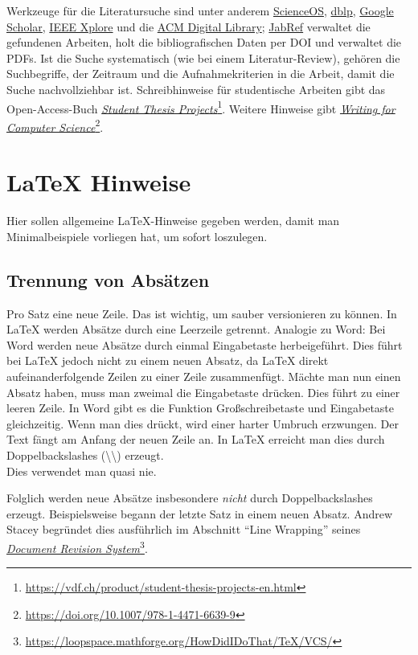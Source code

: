 Werkzeuge für die Literatursuche sind unter anderem \href{https://www.scienceos.ai/}{ScienceOS}, \href{https://dblp.org/}{dblp}, \href{https://scholar.google.com/}{Google Scholar}, \href{https://ieeexplore.ieee.org/}{IEEE Xplore} und die \href{https://dl.acm.org/}{ACM Digital Library}; \href{https://www.jabref.org/}{JabRef} verwaltet die gefundenen Arbeiten, holt die bibliografischen Daten per DOI und verwaltet die PDFs.
Ist die Suche systematisch (wie bei einem Literatur-Review), gehören die Suchbegriffe, der Zeitraum und die Aufnahmekriterien in die Arbeit, damit die Suche nachvollziehbar ist.
Schreibhinweise für studentische Arbeiten gibt das Open-Access-Buch \href{https://vdf.ch/product/student-thesis-projects-en.html}{\emph{Student Thesis Projects}}\footnote{\url{https://vdf.ch/product/student-thesis-projects-en.html}}.
Weitere Hinweise gibt \href{https://doi.org/10.1007/978-1-4471-6639-9}{\emph{Writing for Computer Science}}\footnote{\url{https://doi.org/10.1007/978-1-4471-6639-9}}.

\ifluatex
\fi

\section{LaTeX Hinweise}
\label{sec:latexhints}

Hier sollen allgemeine \LaTeX-Hinweise gegeben werden, damit man Minimalbeispiele vorliegen hat, um sofort loszulegen.

\subsection{Trennung von Absätzen}

\begin{ltgexample}
Pro Satz eine neue Zeile.
Das ist wichtig, um sauber versionieren zu können.
In LaTeX werden Absätze durch eine Leerzeile getrennt.
Analogie zu Word: Bei Word werden neue Absätze durch einmal Eingabetaste herbeigeführt.
Dies führt bei LaTeX jedoch nicht zu einem neuen Absatz, da LaTeX direkt aufeinanderfolgende Zeilen zu einer Zeile zusammenfügt.
Mächte man nun einen Absatz haben, muss man zweimal die Eingabetaste drücken.
Dies führt zu einer leeren Zeile.
In Word gibt es die Funktion Großschreibetaste und Eingabetaste gleichzeitig.
Wenn man dies drückt, wird einer harter Umbruch erzwungen.
Der Text fängt am Anfang der neuen Zeile an.
In LaTeX erreicht man dies durch Doppelbackslashes (\textbackslash\textbackslash) erzeugt.
\\
Dies verwendet man quasi nie.

Folglich werden neue Absätze insbesondere \emph{nicht} durch Doppelbackslashes erzeugt.
Beispielsweise begann der letzte Satz in einem neuen Absatz.
Andrew Stacey begründet dies ausführlich im Abschnitt \enquote{Line Wrapping} seines \href{https://loopspace.mathforge.org/HowDidIDoThat/TeX/VCS/#section.3}{\emph{Document Revision System}}\footnote{\url{https://loopspace.mathforge.org/HowDidIDoThat/TeX/VCS/}}.
\end{ltgexample}

